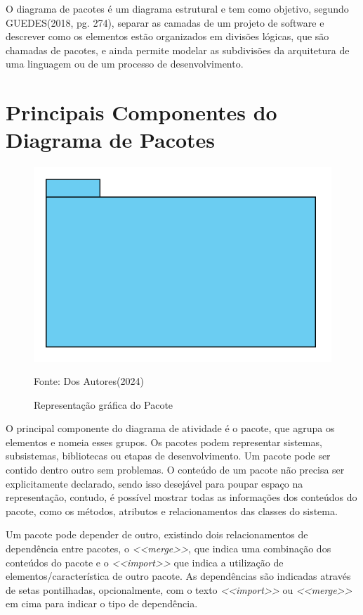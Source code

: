 \documentclass[12pt,openright,oneside,a4paper,
	chapter=TITLE,
	section=TITLE,
	english,brazil]{abntex2}
\begin{document}
O diagrama de pacotes é um diagrama estrutural e tem como objetivo, segundo GUEDES(2018, pg. 274), separar as camadas de um projeto de software e descrever como os elementos estão organizados em divisões lógicas, que são chamadas de pacotes, e ainda permite modelar as subdivisões da arquitetura de uma linguagem ou de um processo de desenvolvimento.

\section{Principais Componentes do Diagrama de Pacotes}

\begin{figure}
	\caption{Representação gráfica do Pacote}
	\centering
	\includegraphics[scale=0.5]{img/Pacote.png}
	\\

	\label{ElementoPacote}
	\footnotesize\raggedright Fonte: Dos Autores(2024)
\end{figure}

O principal componente do diagrama de atividade é o pacote, que agrupa os elementos e nomeia esses grupos. Os pacotes podem representar sistemas, subsistemas, bibliotecas ou etapas de desenvolvimento. Um pacote pode ser contido dentro outro sem problemas. O conteúdo de um pacote não precisa ser explicitamente declarado, sendo isso desejável para poupar espaço na representação, contudo, é possível mostrar todas as informações dos conteúdos do pacote, como os métodos, atributos e relacionamentos das classes do sistema.

Um pacote pode depender de outro, existindo dois relacionamentos de dependência entre pacotes, o \textit{<<merge>>}, que indica uma combinação dos conteúdos do pacote  e o \textit{<<import>>} que indica a utilização de elementos/característica de outro pacote.  As dependências são indicadas através de setas pontilhadas, opcionalmente, com o texto \textit{<<import>>} ou \textit{<<merge>>} em cima para indicar o tipo de dependência.
\end{document}
